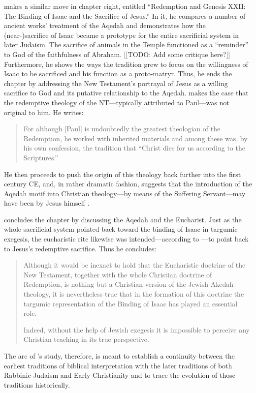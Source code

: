 \vermes makes a similar move in chapter eight, entitled ``Redemption and Genesis XXII: The Binding of Isaac and the Sacrifice of Jesus.'' In it, he compares a number of ancient works' treatment of the Aqedah and demonstrates how the (near-)sacrifice of Isaac became a prototype for the entire sacrificial system in later Judaism. The sacrifice of animals in the Temple functioned as a ``reminder'' to God of the faithfulness of Abraham. [[TODO: Add some critique here?]] Furthermore, he shows the ways the tradition grew to focus on the willingness of Isaac to be sacrificed and his function as a proto-matryr. Thus, he ends the chapter by addressing the New Testament's portrayal of Jesus as a willing sacrifice to God and its putative relationship to the Aqedah. \vermes makes the case that the redemptive theology of the NT---typically attributed to Paul---was not original to him. He writes: 

\begin{quote}
    For although {[}Paul{]} is undoubtedly the greatest theologian of the Redemption, he worked with inherited materials and among these was, by his own confession, the tradition that ``Christ dies for us according to the Scriptures.''\autocite[221]{vermes1961}
\end{quote}
\noindent
%
He then proceeds to push the origin of this theology back further into the first century CE, and, in rather dramatic fashion, suggests that the introduction of the Aqedah motif into Christian theology---by means of the Suffering Servant---may have been by Jesus himself \autocite[223]{vermes1961}. 

\vermes concludes the chapter by discussing the Aqedah and the Eucharist. Just as the whole sacrificial system pointed back toward the binding of Isaac in targumic exegesis, the eucharistic rite likewise was intended---according to \vermes---to point back to Jesus's redemptive sacrifice. Thus he concludes: 

\begin{quote}
    Although it would be inexact to hold that the Eucharistic doctrine of the New Testament, together with the whole Christian doctrine of Redemption, is nothing but a Christian version of the Jewish Akedah theology, it is nevertheless true that in the formation of this doctrine the targumic representation of the Binding of Isaac has played an essential role. 
    
    Indeed, without the help of Jewish exegesis it is impossible to perceive any Christian teaching in its true perspective.\autocite[227]{vermes1961}
\end{quote} 
\noindent
%
The arc of \vermes's study, therefore, is meant to establish a continuity between the earliest traditions of biblical interpretation with the later traditions of both Rabbinic Judaism and Early Christianity and to trace the evolution of those traditions historically. 

